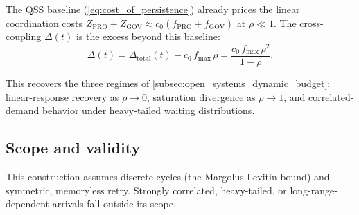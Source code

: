 The QSS baseline (\cref{eq:cost_of_persistence}) already prices the linear coordination costs $Z_{\mathrm{PRO}} + Z_{\mathrm{GOV}} \approx c_0(f_{\mathrm{PRO}} + f_{\mathrm{GOV}})$ at $\rho \ll 1$. The cross-coupling $\Delta(t)$ is the excess beyond this baseline:
\begin{equation}
    \Delta(t) = \Delta_{\text{total}}(t) - c_0 \, f_{\max} \, \rho = \frac{c_0 \, f_{\max} \, \rho^2}{1-\rho}.
\end{equation}

This recovers the three regimes of \cref{subsec:open_systems_dynamic_budget}: linear-response recovery as $\rho \to 0$, saturation divergence as $\rho \to 1$, and correlated-demand behavior under heavy-tailed waiting distributions.

\subsection{Scope and validity}
This construction assumes discrete cycles (the Margolus-Levitin bound) and symmetric, memoryless retry. Strongly correlated, heavy-tailed, or long-range-dependent arrivals fall outside its scope.
